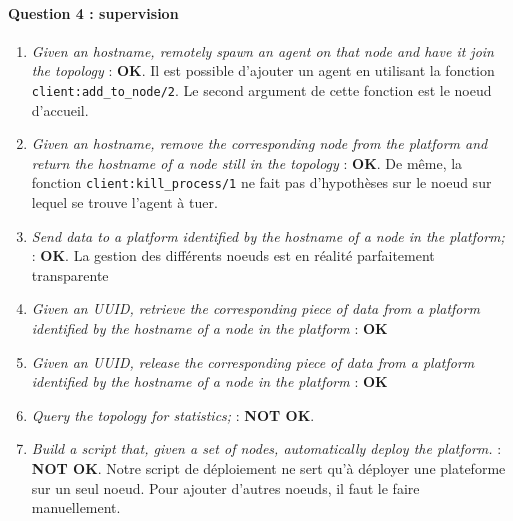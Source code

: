 \documentclass[a4paper]{article}
\begin{document}
\paragraph{Question 4 : supervision}
\begin{enumerate}[label=\alph*)]
    \item \textit{Given an hostname, remotely spawn an agent on that node and have it join the topology} : \textbf{OK}. Il est possible d'ajouter un agent en utilisant la fonction \texttt{client:add\_to\_node/2}. Le second argument de cette fonction est le noeud d'accueil.
    \item \textit{Given an hostname, remove the corresponding node from the platform and return the hostname of
a node still in the topology} : \textbf{OK}. De même, la fonction \texttt{client:kill\_process/1} ne fait pas d'hypothèses sur le noeud sur lequel se trouve l'agent à tuer.
    \item \textit{Send data to a platform identified by the hostname of a node in the platform;} : \textbf{OK}. La gestion des différents noeuds est en réalité parfaitement transparente
    \item \textit{Given an UUID, retrieve the corresponding piece of data from a platform identified by the hostname
of a node in the platform} : \textbf{OK}
    \item \textit{Given an UUID, release the corresponding piece of data from a platform identified by the
hostname of a node in the platform} : \textbf{OK}
    \item \textit{Query the topology for statistics;} : \textbf{NOT OK}.
    \item \textit{Build a script that, given a set of nodes, automatically deploy the platform.} : \textbf{NOT OK}. Notre script de déploiement ne sert qu'à déployer une plateforme sur un seul noeud. Pour ajouter d'autres noeuds, il faut le faire manuellement.
\end{enumerate}
\end{document}
